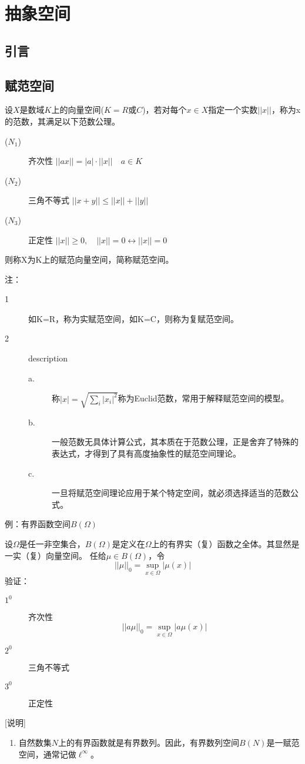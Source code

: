 \chapter{抽象空间}\label{chap:introduction}

\section{引言}

\section{赋范空间}
设$X$是数域$K$上的向量空间($K=R$或$C$)，若对每个$x\in X$指定一个实数$||x||$，称为x的范数，其满足以下范数公理。
\indent
\begin{description}
	\item[($N_1$)] 齐次性     \quad\qquad $||ax||=|a|\cdot||x||\quad a\in K$
	\item[($N_2$)] 三角不等式 \quad $||x+y|| \leq ||x|| + ||y||$
	\item[($N_3$)] 正定性     \quad\qquad $||x||\geq 0,\quad ||x||=0 \leftrightarrow  ||x||=0$
\end{description}
则称X为K上的赋范向量空间，简称赋范空间。

\noindent 注：
\begin{description}
	\item[1] 如K=R，称为实赋范空间，如K=C，则称为复赋范空间。
    \item[2] description
    \begin{description}
    	\item[a.] 称$|x| = \sqrt{\sum_i |x_i|^2}$称为Euclid范数，常用于解释赋范空间的模型。
    	\item[b.] 一般范数无具体计算公式，其本质在于范数公理，正是舍弃了特殊的表达式，才得到了具有高度抽象性的赋范空间理论。
    	\item[c.] 一旦将赋范空间理论应用于某个特定空间，就必须选择适当的范数公式。
    \end{description}
\end{description}


\noindent 
例：{\heiti 有界函数空间$B(\Omega)$}

设$\Omega$是任一非空集合，$B(\Omega)$是定义在$\Omega$上的有界实（复）函数之全体。其显然是一实（复）向量空间。
任给$\mu\in B(\Omega)$，令
$$||\mu||_0 =  \sup_{x\in\Omega} |\mu(x)|$$
\noindent 验证：
\begin{description}
	\item[$1^0$] 齐次性
	  $$||a\mu||_0 =  \sup_{x\in\Omega} |a\mu(x)|$$
	\item[$2^0$] 三角不等式
		
	\item[$3^0$] 正定性
\end{description}
[说明]
\begin{enumerate}
	\item 自然数集$ N $上的有界函数就是有界数列。因此，有界数列空间$ B(N) $是一赋范空间，通常记做$ \ell^{\infty} $。
	
\end{enumerate}



